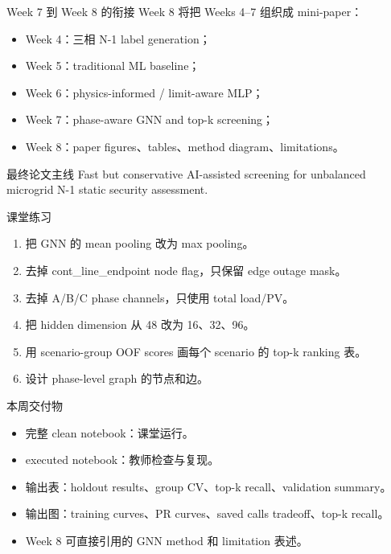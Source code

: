 \documentclass[aspectratio=169,11pt]{beamer}
\begin{document}
\begin{frame}{Week 7 到 Week 8 的衔接}
Week 8 将把 Weeks 4--7 组织成 mini-paper：
\begin{itemize}
  \item Week 4：三相 N-1 label generation；
  \item Week 5：traditional ML baseline；
  \item Week 6：physics-informed / limit-aware MLP；
  \item Week 7：phase-aware GNN and top-k screening；
  \item Week 8：paper figures、tables、method diagram、limitations。
\end{itemize}
\begin{block}{最终论文主线}
Fast but conservative AI-assisted screening for unbalanced microgrid N-1 static security assessment.
\end{block}
\end{frame}

\begin{frame}{课堂练习}
\begin{enumerate}
  \item 把 GNN 的 mean pooling 改为 max pooling。
  \item 去掉 cont\_line\_endpoint node flag，只保留 edge outage mask。
  \item 去掉 A/B/C phase channels，只使用 total load/PV。
  \item 把 hidden dimension 从 48 改为 16、32、96。
  \item 用 scenario-group OOF scores 画每个 scenario 的 top-k ranking 表。
  \item 设计 phase-level graph 的节点和边。
\end{enumerate}
\end{frame}

\begin{frame}{本周交付物}
\begin{itemize}
  \item 完整 clean notebook：课堂运行。
  \item executed notebook：教师检查与复现。
  \item 输出表：holdout results、group CV、top-k recall、validation summary。
  \item 输出图：training curves、PR curves、saved calls tradeoff、top-k recall。
  \item Week 8 可直接引用的 GNN method 和 limitation 表述。
\end{itemize}
\end{frame}
\end{document}
